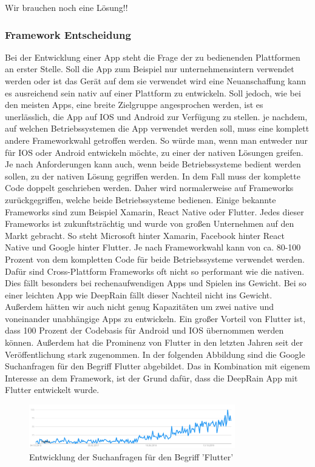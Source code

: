  Wir brauchen noch eine Lösung!! 

\subsubsection{Framework Entscheidung}\label{framework entscheidung}
Bei der Entwicklung einer App steht die Frage der zu bedienenden Plattformen an erster Stelle. Soll die App zum Beispiel nur unternehmensintern verwendet 
werden oder ist das Gerät auf dem sie verwendet wird eine Neuanschaffung kann es ausreichend sein nativ auf einer Plattform zu entwickeln. Soll jedoch, 
wie bei den meisten Apps, eine breite Zielgruppe angesprochen werden, ist es unerlässlich, die App auf IOS und Android zur Verfügung zu stellen. 
je nachdem, auf welchen Betriebssystemen die App verwendet werden soll, muss eine komplett andere Frameworkwahl getroffen werden. 
So würde man, wenn man entweder nur für IOS oder Android entwickeln möchte, zu einer der nativen Lösungen greifen. Je nach Anforderungen kann auch, 
wenn beide Betriebssysteme bedient werden sollen, zu der nativen Lösung gegriffen werden. In dem Fall muss der komplette Code doppelt 
geschrieben werden. Daher wird normalerweise auf Frameworks zurückgegriffen, welche beide Betriebssysteme bedienen. 
Einige bekannte Frameworks sind zum Beispiel Xamarin, React Native oder Flutter. Jedes dieser Frameworks ist zukunftsträchtig und wurde von großen 
Unternehmen auf den Markt gebracht. So steht Microsoft hinter Xamarin, Facebook hinter React Native und Google hinter Flutter. 
Je nach Frameworkwahl kann von ca. 80-100 Prozent von dem kompletten Code für beide Betriebssysteme verwendet werden. 
Dafür sind Cross-Plattform Frameworks oft nicht so performant wie die nativen. Dies fällt besonders bei rechenaufwendigen Apps und Spielen ins Gewicht. 
Bei so einer leichten App wie DeepRain fällt dieser Nachteil nicht ins Gewicht. Außerdem hätten wir auch nicht genug Kapazitäten um zwei native und 
voneinander unabhängige Apps zu entwickeln. 
Ein großer Vorteil von Flutter ist, dass 100 Prozent der Codebasis für Android und IOS übernommen werden können. Außerdem hat die Prominenz von 
Flutter in den letzten Jahren seit der Veröffentlichung stark zugenommen. In der folgenden Abbildung sind die Google Suchanfragen für den Begriff 
Flutter abgebildet.  Das in Kombination mit eigenem Interesse an dem Framework, ist der Grund dafür, dass die DeepRain App mit Flutter entwickelt wurde.
\begin{figure}[H]
 \centering
 \includegraphics[width=0.8\textwidth,angle=0]{abb/flutter_google_trends}
 \caption[Entwicklung von Flutter]{Entwicklung der Suchanfragen für den Begriff 'Flutter'}
\label{fig:flutter_google_trends}
\end{figure}

